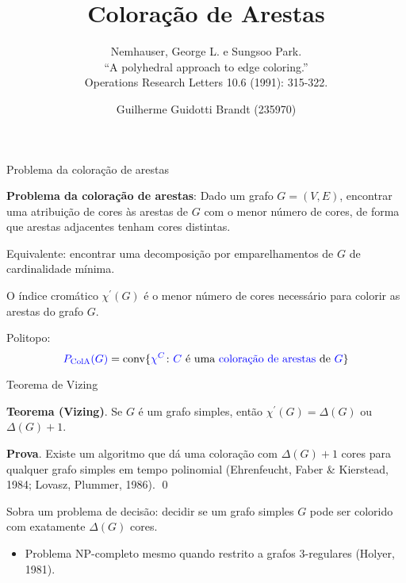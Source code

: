 \documentclass{beamer}
\title{Coloração de Arestas}
\subtitle{
    Nemhauser, George L. e Sungsoo Park.\\
    ``A polyhedral approach to edge coloring.''\\
    Operations Research Letters 10.6 (1991): 315-322.}
\author{Guilherme Guidotti Brandt (235970)}
\institute{IC - Unicamp}
\date{}
\DeclareMathOperator{\conv}{\mathrm{conv}}
\begin{document}
    \frame{\titlepage}

    \begin{frame}{Problema da coloração de arestas}

        {\bf Problema da coloração de arestas}: Dado um grafo {\color{blue}$G = (V, E)$}, encontrar uma atribuição de cores às arestas de {\color{blue}$G$} com o menor número de cores, de forma que arestas adjacentes tenham cores distintas.

        \pause
        \vspace{.5cm}
        Equivalente: encontrar uma decomposição por emparelhamentos de {\color{blue}$G$} de cardinalidade mínima.
        
        \vspace{.5cm}
        \pause
        O {\color{blue} índice cromático $\chi^\prime(G)$} é o menor número de cores necessário para colorir as arestas do grafo {\color{blue} $G$}.

        \vspace{.5cm}
        \pause
        Politopo:
        $${\color{blue} P_\mathrm{ColA}(G)} = \conv \{{\color{blue} \chi^C} \colon {\color{blue} C} \text{ é uma {\color{blue} coloração de arestas} de } {\color{blue} G} \}$$
    \end{frame}

    \begin{frame}{Teorema de Vizing}

        {\color{blue} \bf Teorema (Vizing)}. Se $G$ é um grafo simples, então {\color{blue} $\chi^\prime(G) = \Delta(G)$} ou {\color{blue} $\Delta(G) + 1$}.
        \pause

        \vspace{.5cm}
        {\color{blue} {\bf Prova}}. Existe um algoritmo que dá uma coloração com {\color{blue} $\Delta(G) + 1$} cores para qualquer grafo simples  em tempo polinomial {\color{blue} (Ehrenfeucht, Faber \& Kierstead, 1984; Lovasz, Plummer, 1986)}. \qed
        \pause

        \vspace{.5cm}
        Sobra um problema de decisão: decidir se um grafo simples {\color{blue} $G$} pode ser colorido com exatamente {\color{blue} $\Delta(G)$} cores.
        \begin{itemize}
            \item Problema NP-completo mesmo quando restrito a grafos 3-regulares {\color{blue} (Holyer, 1981)}.
        \end{itemize}
    \end{frame}
\end{document}

